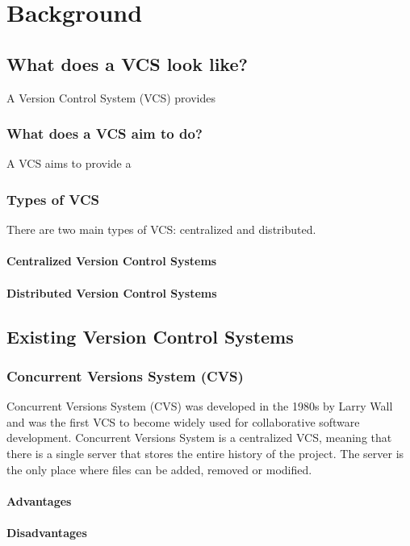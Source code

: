 \chapter{Background}
\section{What does a VCS look like?}
A Version Control System (VCS) provides 
\subsection{What does a VCS aim to do?}
A VCS aims to provide a
\subsection{Types of VCS}
There are two main types of VCS: centralized and distributed.
\subsubsection{Centralized Version Control Systems}
\subsubsection{Distributed Version Control Systems}
\section{Existing Version Control Systems}
\subsection{Concurrent Versions System (CVS)}
Concurrent Versions System (CVS) was developed in the 1980s by Larry Wall and was the first VCS to become widely used for collaborative software development. Concurrent Versions System is a centralized VCS, meaning that there is a single server that stores the entire history of the project. The server is the only place where files can be added, removed or modified. 
\subsubsection{Advantages}
\subsubsection{Disadvantages}
